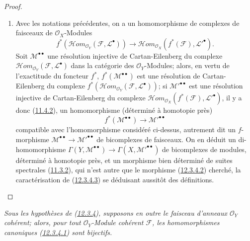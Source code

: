 \begin{proof}
\begin{enumerate}
\item[{\rm(ii)}]
Avec les notations précédentes, on a un homomorphisme de complexes de
faisceaux de $\mathcal O_X$-Modules
\[
f^*(\mathcal{H}om_{\mathcal O_Y}(\mathcal F,\mathcal L^\bullet))
\longrightarrow
\mathcal{H}om_{\mathcal O_X}(f^*(\mathcal F),\mathcal L'^\bullet).
\]
Soit $\mathcal M^{\bullet\bullet}$ une résolution injective de
Cartan-Eilenberg du complexe
$\mathcal{H}om_{\mathcal O_Y}(\mathcal F,\mathcal L^\bullet)$ dans la
catégorie des $\mathcal O_Y$-Modules; alors, en vertu de l'exactitude du
foncteur $f^*$, $f^*(\mathcal M^{\bullet\bullet})$ est une résolution de
Cartan-Eilenberg du complexe
$f^*(\mathcal{H}om_{\mathcal O_Y}(\mathcal F,\mathcal L^\bullet))$; si
$\mathcal M'^{\bullet\bullet}$ est une résolution injective de
Cartan-Eilenberg du complexe
$\mathcal{H}om_{\mathcal O_X}(f^*(\mathcal F),\mathcal L'^\bullet)$, il y a
donc (\hyperref[0.11.4.2-fr]{11.4.2}), un homomorphisme (déterminé à
homotopie près)
\[
f^*(\mathcal M^{\bullet\bullet})\longrightarrow
\mathcal M'^{\bullet\bullet}
\]
compatible avec l'homomorphisme considéré ci-dessus, autrement dit un
$f$-morphisme $\mathcal M^{\bullet\bullet}\to
\mathcal M'^{\bullet\bullet}$ de bicomplexes de faisceaux. On en déduit un
di-homomorphisme
$\Gamma(Y,\mathcal M^{\bullet\bullet})\to
\Gamma(X,\mathcal M'^{\bullet\bullet})$ de bicomplexes de modules, déterminé
à homotopie près, et un morphisme bien déterminé de suites spectrales
(\hyperref[0.11.3.2-fr]{11.3.2}), qui n'est autre que le morphisme
(\hyperref[0.12.3.4.2-fr]{12.3.4.2}) cherché, la caractérisation de
(\hyperref[0.12.3.4.3-fr]{12.3.4.3}) se déduisant aussitôt des définitions.
\end{enumerate}
\end{proof}

\begin{proposition}[12.3.5]
\label{0.12.3.5-fr}
\emph{Sous les hypothèses de (\hyperref[0.12.3.4-fr]{12.3.4}), supposons en
outre le faisceau d'anneaux $\mathcal O_Y$ cohérent; alors, pour tout
$\mathcal O_Y$-Module cohérent $\mathcal F$, les homomorphismes canoniques
(\hyperref[0.12.3.4.1-fr]{12.3.4.1}) sont bijectifs.}
\end{proposition}

